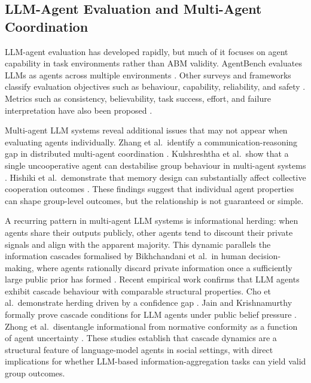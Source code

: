 \documentclass[11pt]{article}
\begin{document}
\subsection{LLM-Agent Evaluation and Multi-Agent Coordination}
LLM-agent evaluation has developed rapidly, but much of it focuses on agent capability in
task environments rather than ABM validity. AgentBench evaluates LLMs as agents across
multiple environments \cite{li2024agentbench}. Other surveys and frameworks classify
evaluation objectives such as behaviour, capability, reliability, and safety
\cite{mohammadi2025evaluation}. Metrics such as consistency, believability, task success,
effort, and failure interpretation have also been proposed
\cite{chen2024evaluating, barkur2024magenta, sung2025verila}.

Multi-agent LLM systems reveal additional issues that may not appear when evaluating agents
individually. Zhang et al.\ identify a communication-reasoning gap in distributed
multi-agent coordination \cite{zhang2026silo}.
Kulshreshtha et al.\ show that a single uncooperative agent can destabilise group behaviour
in multi-agent systems \cite{kulshreshtha2026defection}. Hishiki et al.\ demonstrate that
memory design can substantially affect collective cooperation outcomes
\cite{hishiki2026memory}. These findings suggest that individual agent properties can shape
group-level outcomes, but the relationship is not guaranteed or simple.

A recurring pattern in multi-agent LLM systems is informational herding: when agents share
their outputs publicly, other agents tend to discount their private signals and align with
the apparent majority. This dynamic parallels the information cascades formalised by
Bikhchandani et al.\ in human decision-making, where agents rationally discard private
information once a sufficiently large public prior has formed \cite{bikhchandani1992theory}.
Recent empirical work confirms that LLM agents exhibit cascade behaviour with comparable
structural properties. Cho et al.\ demonstrate herding driven by a confidence gap
\cite{cho2025herd}. Jain and Krishnamurthy formally prove cascade conditions for LLM agents
under public belief pressure \cite{jain2025social}. Zhong et al.\ disentangle informational
from normative conformity as a function of agent uncertainty \cite{zhong2025conformity}.
These studies establish that cascade dynamics are a structural feature of language-model
agents in social settings, with direct implications for whether LLM-based information-aggregation
tasks can yield valid group outcomes.
\end{document}
